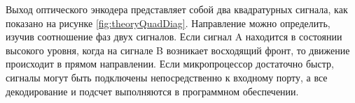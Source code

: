 \documentclass[11pt, a4paper]{article}
\begin{document}
Выход оптического энкодера представляет собой два квадратурных сигнала, как показано на рисунке \ref{fig:theoryQuadDiag}. Направление можно определить, изучив соотношение фаз двух сигналов. Если сигнал A находится в состоянии высокого уровня, когда на сигнале B возникает восходящий фронт, то движение происходит в прямом направлении. Если микропроцессор достаточно быстр, сигналы могут быть подключены непосредственно к входному порту, а все декодирование и подсчет выполняются в программном обеспечении.
\end{document}
